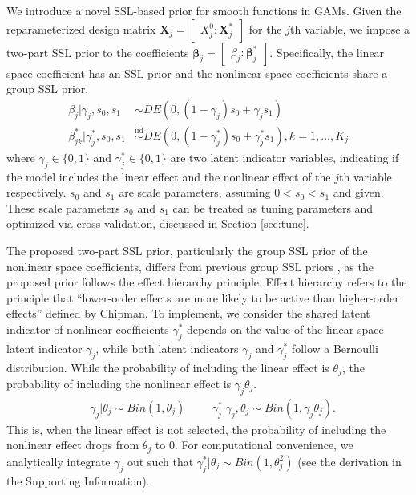 \documentclass[AMA,STIX1COL,]{WileyNJD-v2}
\begin{document}
We introduce a novel SSL-based prior for smooth functions in GAMs. Given
the reparameterized design matrix
\(\boldsymbol{X}_j = \begin{bmatrix} X^0_j : \boldsymbol{X}_j^*\end{bmatrix}\)
for the \(j\)th variable, we impose a two-part SSL prior to the
coefficients
\(\boldsymbol{\beta}_j = \begin{bmatrix} \beta_j : \boldsymbol{\beta}_j^*\end{bmatrix}\).
Specifically, the linear space coefficient has an SSL prior and the
nonlinear space coefficients share a group SSL prior,
\begin{align}\label{eq:bham_ssl}
  \beta_{j} | \gamma_{j},s_0,s_1 &\sim DE(0,(1-\gamma_{j}) s_0 + \gamma_{j} s_1) \nonumber \\
  \beta^*_{jk} | \gamma^*_{j},s_0,s_1 &\overset{\text{iid}}{\sim}DE(0,(1-\gamma^*_{j}) s_0 + \gamma^*_{j} s_1), k=1,\dots, K_j
\end{align} where \(\gamma_{j}\in\{0,1\}\) and
\(\gamma^*_{j}\in \{0,1\}\) are two latent indicator variables,
indicating if the model includes the linear effect and the nonlinear
effect of the \(j\)th variable respectively. \(s_0\) and \(s_1\) are
scale parameters, assuming \(0 < s_0 < s_1\) and given. These scale
parameters \(s_0\) and \(s_1\) can be treated as tuning parameters and
optimized via cross-validation, discussed in Section \ref{sec:tune}.

The proposed two-part SSL prior, particularly the group SSL prior of the
nonlinear space coefficients, differs from previous group SSL priors
\cite{Tang2018, Tang2019}, as the proposed prior follows the effect
hierarchy principle. Effect hierarchy refers to the principle that
``lower-order effects are more likely to be active than higher-order
effects'' defined by Chipman\cite{chipman2006prior}. To implement, we
consider the shared latent indicator of nonlinear coefficients
\(\gamma^*_j\) depends on the value of the linear space latent indicator
\(\gamma_j\), while both latent indicators \(\gamma_j\) and
\(\gamma^*_j\) follow a Bernoulli distribution. While the probability of
including the linear effect is \(\theta_j\), the probability of
including the nonlinear effect is \(\gamma_{j}\theta_j\). \[
\begin{aligned}
&\gamma_{j} | \theta_j \sim Bin(1, \theta_j) & & 
&\gamma_{j}^*| \gamma_{j}, \theta_j \sim Bin(1, \gamma_{j}\theta_j).
\end{aligned}
\] This is, when the linear effect is not selected, the probability of
including the nonlinear effect drops from \(\theta_j\) to 0. For
computational convenience, we analytically integrate \(\gamma_j\) out
such that \(\gamma_{j}^*| \theta_j \sim Bin(1, \theta_j^2)\) (see the
derivation in the Supporting Information).
\end{document}
